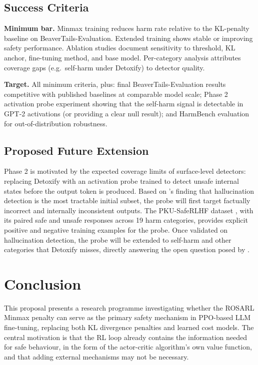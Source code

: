\documentclass[a4paper,twoside,12pt]{report}
\begin{document}
\section{Success Criteria}

\textbf{Minimum bar.} Minmax training reduces harm rate relative to the KL-penalty
baseline on BeaverTails-Evaluation. Extended training shows stable or improving safety
performance. Ablation studies document sensitivity to threshold, KL anchor, fine-tuning
method, and base model. Per-category analysis attributes coverage gaps (e.g.\ self-harm
under Detoxify) to detector quality.

\textbf{Target.} All minimum criteria, plus: final BeaverTails-Evaluation results
competitive with published baselines at comparable model scale; Phase 2 activation probe
experiment showing that the self-harm signal is detectable in GPT-2 activations (or
providing a clear null result); and HarmBench \citep{mazeika2024} evaluation for
out-of-distribution robustness.

\section{Proposed Future Extension}

Phase 2 is motivated by the expected coverage limits of surface-level detectors:
replacing Detoxify with an activation probe trained to detect unsafe internal states before
the output token is produced. Based on \citet{rateike2023}'s finding that hallucination
detection is the most tractable initial subset, the probe will first target factually
incorrect and internally inconsistent outputs.
The PKU-SafeRLHF dataset \citep{ji2024pkusaferlhf}, with its paired safe and unsafe
responses across 19 harm categories, provides explicit positive and negative training
examples for the probe. Once validated on hallucination detection, the probe will be extended
to self-harm and other categories that Detoxify misses, directly answering the open question
posed by \citet{cintas2025}.

\chapter{Conclusion}
\label{ch:conclusion}

This proposal presents a research programme investigating whether the ROSARL Minmax penalty
can serve as the primary safety mechanism in PPO-based LLM fine-tuning, replacing both KL
divergence penalties and learned cost models. The central motivation is that the RL loop
already contains the information needed for safe behaviour, in the form of the actor-critic
algorithm's own value function, and that adding external mechanisms may not be necessary.
\end{document}
